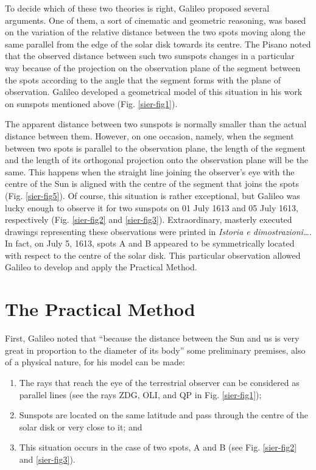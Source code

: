 \begin{artengenv}
To decide which of these two theories is right, Galileo proposed several arguments. One of them, a sort of cinematic and
geometric reasoning, was based on the variation of the relative distance between the two spots moving along the same
parallel from the edge of the solar disk towards its centre. The Pisano noted that the observed distance between such
two sunspots changes in a particular way because of the projection on the observation plane of the segment between the
spots according to the angle that the segment forms with the plane of observation. Galileo developed a geometrical
model of this situation in his work on sunspots mentioned above (Fig. \ref{sier-fig1}). 

The apparent distance between two sunspots is normally smaller than the actual distance between them. However, on one
occasion, namely, when the segment between two spots is parallel to the observation plane, the length of the segment
and the length of its orthogonal projection onto the observation plane will be the same. This happens when the straight
line joining the observer’s eye with the centre of the Sun is aligned with the centre of the segment that joins the
spots (Fig. \ref{sier-fig5}). Of course, this situation is rather exceptional, but Galileo was lucky enough to observe it for two
sunspots on 01 July 1613 and 05 July 1613, respectively (Fig. \ref{sier-fig2} and \ref{sier-fig3}). Extraordinary, masterly executed drawings
representing these observations were printed in \textit{Istoria e dimostrazioni\ldots. }In fact, on July 5, 1613, spots A
and B appeared to be symmetrically located with respect to the centre of the solar disk. This particular observation
allowed Galileo to develop and apply the Practical Method. 

\section{The Practical Method}

First, Galileo noted that ``because the distance between the Sun and us is very great in proportion to the diameter of
its body''
\parencite[see  V, 121.5;][p.112]{galilei_sunspots_2010}
some preliminary premises, also of a physical
nature, for his model can be made: 

\begin{enumerate}
	\item The rays that reach the eye of the terrestrial observer can be considered as parallel lines (see the rays ZDG, OLI,
	and QP in Fig. \ref{sier-fig1});
	\item Sunspots are located on the same latitude and pass through the centre of the solar disk or very close to it; and
	\item This situation occurs in the case of two spots, A and B (see Fig. \ref{sier-fig2} and \ref{sier-fig3}).
\end{enumerate}


\end{artengenv}
